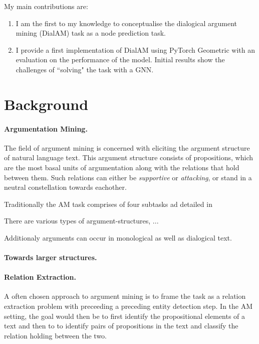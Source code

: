 \documentclass[11pt]{article}
\begin{document}
My main contributions are:
\begin{enumerate}
    \item I am the first to my knowledge to conceptualise the dialogical argument mining (DialAM) task as a node prediction task.
    \item I provide a first implementation of DialAM using PyTorch Geometric with an evaluation on the performance of the model. Initial results show the challenges of ``solving" the task with a GNN.
\end{enumerate}

\section{Background}
\label{sect:background}

\paragraph{Argumentation Mining.} The field of argument mining is concerned with eliciting the argument structure of natural language text. This argument structure consists of propositions, which are the most basal units of argumentation along with the relations that hold between them. Such relations can either be \textit{supportive} or \textit{attacking}, or stand in a neutral constellation towards eachother. 

Traditionally the AM task comprises of four subtasks ad detailed in \citet{}

There are various types of argument-structures, ... 

Additionaly arguments can occur in monological as well as dialogical text.

\paragraph{Towards larger structures.}

\paragraph{Relation Extraction.} A often chosen approach to argument mining is to frame the task as a relation extraction problem with preceeding a preceding entity detection step. In the AM setting, the goal would then be to first identify the propositional elements of a text and then to to identify pairs of propositions in the text and classify the relation holding between the two. \\
\end{document}
